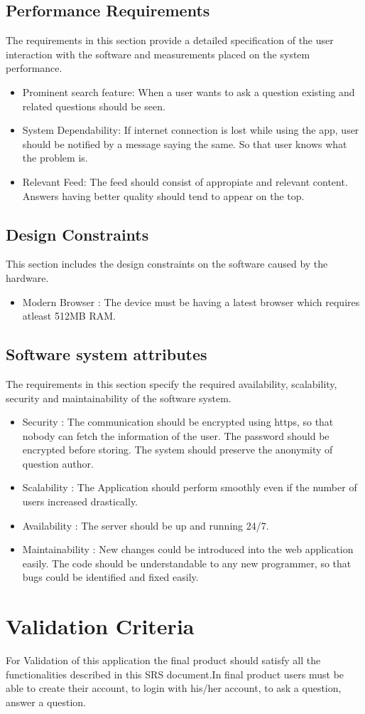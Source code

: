 \documentclass[journal,12pt,onecolumn,draftclsnofoot,]{IEEEtran}
\begin{document}
\subsection{Performance Requirements}
The requirements in this section provide a detailed specification of the user interaction with the software and measurements placed on the system performance.
\begin{itemize}
\item Prominent search feature: When a user wants to ask a question existing and related questions should be seen.
\item System Dependability: If internet connection is lost while using the app, user should be notified by a message saying the same. So that user knows what the problem is.
\item Relevant Feed: The feed should consist of appropiate and relevant content. Answers having better quality should tend to appear on the top.
\end{itemize}

\subsection{Design Constraints}
This section includes the design constraints on the software caused by the hardware.
\begin{itemize}
\item Modern Browser : The device must be having a latest browser which requires atleast 512MB RAM.
\end{itemize}

\subsection{Software system attributes}
The requirements in this section specify the required availability, scalability, security and maintainability of the software system.
\begin{itemize}
\item Security : The communication should be encrypted using https, so that nobody can fetch the information of the user. The password should be encrypted before storing. The system should preserve the anonymity of question author.
\item Scalability : The Application should perform smoothly even if the number of users increased drastically.
\item Availability : The server should be up and running 24/7.
\item Maintainability : New changes could be introduced into the web application easily. The code should be understandable to any new programmer, so that bugs could be identified and fixed easily.
\end{itemize}

\section{Validation Criteria}
For Validation of this application the final product should satisfy all the functionalities described in this SRS document.In final product users must be able to create their account, to login with his/her account, to ask a question, answer a question.
\end{document}
